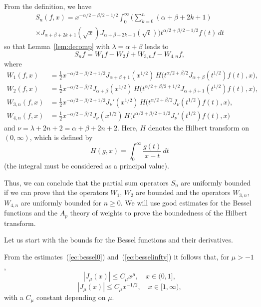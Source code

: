 \documentclass[reqno]{amsart}
\theoremstyle{plain}
\theoremstyle{definition}
\theoremstyle{remark}
\begin{document}
{}From the definition, we have
\begin{multline*}
   S_n(f,x)
   = x^{-\alpha/2-\beta/2-1/2} \int_0^\infty
   \bigg( \sum_{k=0}^n (\alpha+\beta+2k+1)
   \\
   \times J_{\alpha+\beta+2k+1}(\sqrt x)
   J_{\alpha+\beta+2k+1}(\sqrt t)
   \bigg) t^{\alpha/2+\beta/2-1/2} f(t) \, dt
\end{multline*}
so that Lemma~\ref{lem:decomp} with $\lambda=\alpha+\beta$ leads to
\begin{equation*}
   S_n f = W_1 f - W_2 f + W_{3,n} f - W_{4,n} f,
\end{equation*}
where
\begin{align*}
   W_1(f,x) &= \tfrac12 x^{-\alpha/2-\beta/2+1/2} J_{\alpha+\beta+1}(x^{1/2})
   \, H\big( t^{\alpha/2+\beta/2} J_{\alpha+\beta}(t^{1/2}) f(t), x \big),
   \\
   W_2(f,x) &= \tfrac12 x^{-\alpha/2-\beta/2} J_{\alpha+\beta}(x^{1/2})
   \, H\big(t^{\alpha/2+\beta/2+1/2} J_{\alpha+\beta+1}(t^{1/2}) f(t), x \big),
   \\
   W_{3,n}(f,x) &= \tfrac12 x^{-\alpha/2-\beta/2+1/2} J_\nu'(x^{1/2})
   \, H\big(t^{\alpha/2+\beta/2} J_\nu(t^{1/2}) f(t), x\big),
   \\
   W_{4,n}(f,x) &= \tfrac12 x^{-\alpha/2-\beta/2} J_\nu(x^{1/2})
   \, H\big(t^{\alpha/2+\beta/2+1/2} J_\nu'(t^{1/2}) f(t), x\big)
\end{align*}
and $\nu = \lambda+2n+2 = \alpha+\beta+2n+2$. Here, $H$ denotes the
Hilbert transform on $(0,\infty)$, which is defined by
\begin{equation*}
    H(g,x) = \int_0^\infty \frac{g(t)}{x-t}\,dt
\end{equation*}
(the integral must be considered as a principal value).

Thus, we can conclude that the partial sum operators $S_n$ are uniformly
bounded if we can prove that the operators $W_1$, $W_2$ are bounded and the
operators $W_{3,n}$, $W_{4,n}$ are uniformly bounded for $n \ge 0$. We will
use good estimates for the Bessel functions and the $A_p$ theory of weights to
prove the boundedness of the Hilbert transform.

Let us start with the bounds for the Bessel functions and their derivatives.

{}From the estimates~(\ref{ec:bessel0}) and~(\ref{ec:besselinfty}) it
follows that, for $\mu>-1$,
\begin{equation}
\label{ec:cota01}
    |J_\mu(x)| \le C_\mu x^\mu,
    \quad x \in (0,1],
\end{equation}
\begin{equation}
\label{ec:cota1infty}
    |J_\mu(x)| \le C_\mu x^{-1/2},
    \quad x \in [1,\infty),
\end{equation}
with a $C_\mu$ constant depending on $\mu$.
\end{document}
